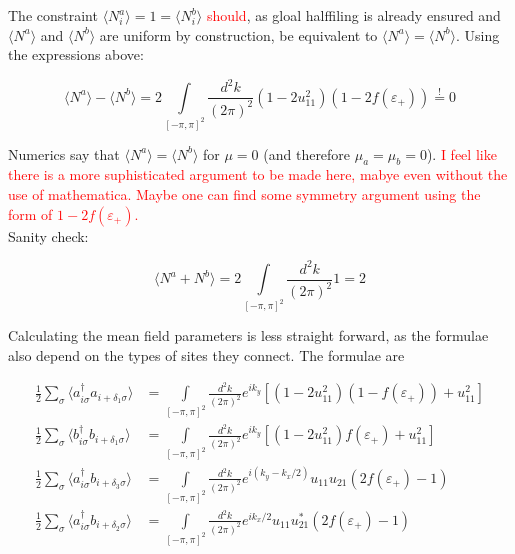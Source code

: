 \documentclass[../../../main.tex]{subfiles}
\begin{document}
The constraint $\langle N^a_i \rangle = 1 = \langle N^b_i\rangle$ \textcolor{red}{should}, as gloal halffiling is already ensured and $\langle N^a \rangle$ and $ \langle N^b \rangle$ are uniform by construction, be equivalent to $\langle N^a \rangle = \langle N^b \rangle$. Using the expressions above:


\begin{equation}
	\langle N^a \rangle - \langle N^b \rangle = 2 \int\limits_{[-\pi,\pi]^2} \frac{d^2k}{(2\pi)^2} (1-2u_{11}^2)(1-2f(\varepsilon_+)) \overset{!}{=} 0
\end{equation}




Numerics say that $\langle N^a \rangle = \langle N^b \rangle$ for $\mu = 0$ (and therefore $\mu_a = \mu_b = 0$). \textcolor{red}{I feel like there is a more suphisticated argument to be made here, mabye even without the use of mathematica. Maybe one can find some symmetry argument using the form of $1-2f(\varepsilon_+)$.} \\

Sanity check:

\begin{equation}
	\langle N^a + N^b \rangle = 2\int\limits_{[-\pi,\pi]^2} \frac{d^2k}{(2\pi)^2} 1 = 2 
\end{equation}

Calculating the mean field parameters is less straight forward, as the formulae also depend on the types of sites they connect. The formulae are 

\begin{align}
	\frac12	\sum_\sigma\langle a_{i\sigma}^\dagger a_{i+\delta_1\sigma } \rangle &= \int\limits_{[-\pi,\pi]^2}  \frac{d^2k}{(2\pi)^2} e^{i k_y} \left[(1-2u_{11}^2)(1-f(\varepsilon_+)) + u_{11}^2\right] \\
	\frac12 \sum_\sigma \langle b_{i\sigma}^\dagger b_{i+\delta_1\sigma} \rangle &= \int\limits_{[-\pi,\pi]^2} \frac{d^2k}{(2\pi)^2} e^{i k_y} \left[(1-2u_{11}^2)f(\varepsilon_+) + u_{11}^2\right] \\
	\frac12 \sum_\sigma \langle a_{i\sigma}^\dagger b_{i+\delta_3\sigma} \rangle &= \int\limits_{[-\pi,\pi]^2} \frac{d^2k}{(2\pi)^2} e^{i(k_y-k_x/2)}u_{11}u_{21}(2f(\varepsilon_+) -1) \\
	\frac12 \sum_\sigma \langle a_{i\sigma}^\dagger b_{i+\delta_2\sigma} \rangle &= \int\limits_{[-\pi, \pi]^2} \frac{d^2k}{(2\pi)^2} e^{ik_x/2} u_{11}u_{21}^*(2f(\varepsilon_+)-1)
\end{align}
\end{document}
